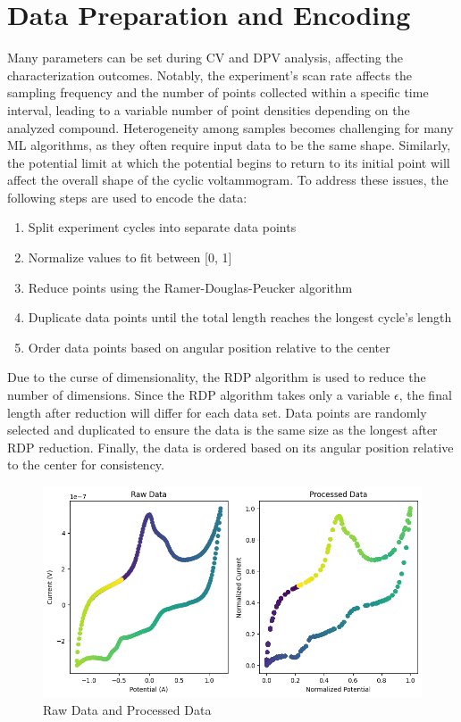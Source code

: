 \section{Data Preparation and Encoding}
Many parameters can be set during CV and DPV analysis, affecting the characterization outcomes. Notably, the experiment's scan rate affects the sampling frequency and the number of points collected within a specific time interval, leading to a variable number of point densities depending on the analyzed compound. Heterogeneity among samples becomes challenging for many ML algorithms, as they often require input data to be the same shape. Similarly, the potential limit at which the potential begins to return to its initial point will affect the overall shape of the cyclic voltammogram. To address these issues, the following steps are used to encode the data:
\begin{enumerate}
    \item Split experiment cycles into separate data points
    \item Normalize values to fit between [0, 1]
    \item Reduce points using the Ramer-Douglas-Peucker algorithm
    \item Duplicate data points until the total length reaches the longest cycle's length
    \item Order data points based on angular position relative to the center
\end{enumerate}
Due to the curse of dimensionality, the RDP algorithm is used to reduce the number of dimensions. Since the RDP algorithm takes only a variable $\epsilon$, the final length after reduction will differ for each data set. Data points are randomly selected and duplicated to ensure the data is the same size as the longest after RDP reduction. Finally, the data is ordered based on its angular position relative to the center for consistency.
\begin{figure}[h!]
  \centering
    \includegraphics[width=1.0\textwidth]{figures/encoding.png}
    \caption{Raw Data and Processed Data}
    \label{encoding}
\end{figure}
